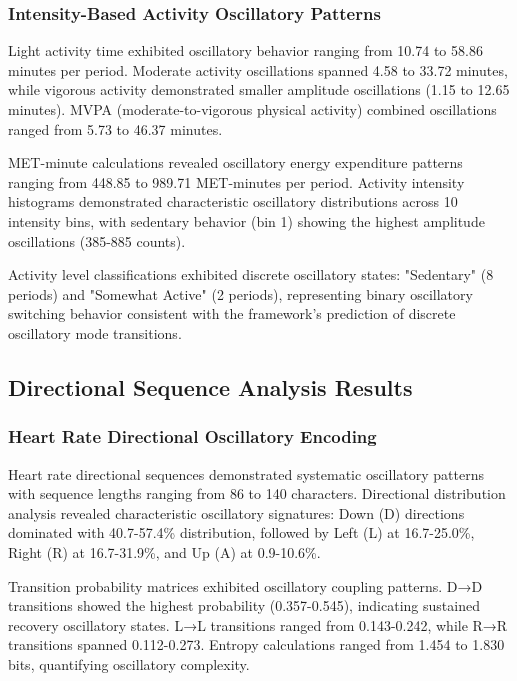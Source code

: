\documentclass[12pt,a4paper]{article}
\theoremstyle{definition}
\begin{document}
\subsubsection{Intensity-Based Activity Oscillatory Patterns}

Light activity time exhibited oscillatory behavior ranging from 10.74 to 58.86 minutes per period. Moderate activity oscillations spanned 4.58 to 33.72 minutes, while vigorous activity demonstrated smaller amplitude oscillations (1.15 to 12.65 minutes). MVPA (moderate-to-vigorous physical activity) combined oscillations ranged from 5.73 to 46.37 minutes.

MET-minute calculations revealed oscillatory energy expenditure patterns ranging from 448.85 to 989.71 MET-minutes per period. Activity intensity histograms demonstrated characteristic oscillatory distributions across 10 intensity bins, with sedentary behavior (bin 1) showing the highest amplitude oscillations (385-885 counts).

Activity level classifications exhibited discrete oscillatory states: "Sedentary" (8 periods) and "Somewhat Active" (2 periods), representing binary oscillatory switching behavior consistent with the framework's prediction of discrete oscillatory mode transitions.

\subsection{Directional Sequence Analysis Results}

\subsubsection{Heart Rate Directional Oscillatory Encoding}

Heart rate directional sequences demonstrated systematic oscillatory patterns with sequence lengths ranging from 86 to 140 characters. Directional distribution analysis revealed characteristic oscillatory signatures: Down (D) directions dominated with 40.7-57.4\% distribution, followed by Left (L) at 16.7-25.0\%, Right (R) at 16.7-31.9\%, and Up (A) at 0.9-10.6\%.

Transition probability matrices exhibited oscillatory coupling patterns. D→D transitions showed the highest probability (0.357-0.545), indicating sustained recovery oscillatory states. L→L transitions ranged from 0.143-0.242, while R→R transitions spanned 0.112-0.273. Entropy calculations ranged from 1.454 to 1.830 bits, quantifying oscillatory complexity.
\end{document}
